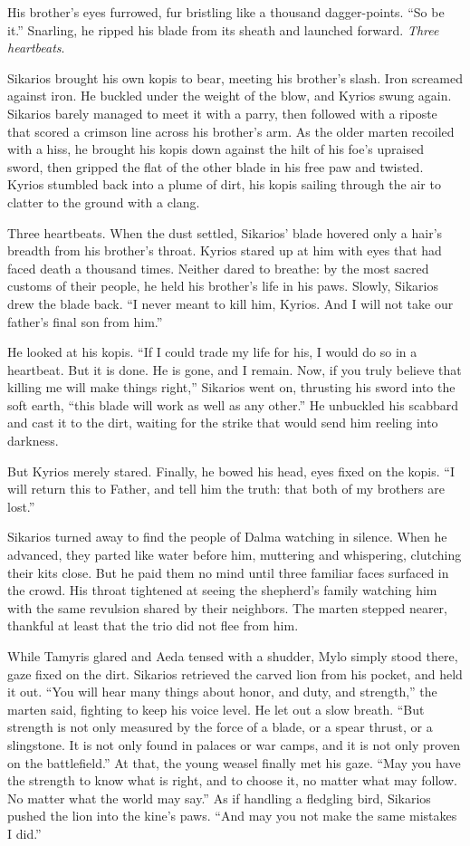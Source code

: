 His brother's eyes furrowed, fur bristling like a thousand dagger-points. ``So be it.'' Snarling, he ripped his blade from its sheath and launched forward. \emph{Three heartbeats}.

Sikarios brought his own kopis to bear, meeting his brother's slash. Iron screamed against iron. He buckled under the weight of the blow, and Kyrios swung again. Sikarios barely managed to meet it with a parry, then followed with a riposte that scored a crimson line across his brother's arm. As the older marten recoiled with a hiss, he brought his kopis down against the hilt of his foe's upraised sword, then gripped the flat of the other blade in his free paw and twisted. Kyrios stumbled back into a plume of dirt, his kopis sailing through the air to clatter to the ground with a clang.

Three heartbeats. When the dust settled, Sikarios' blade hovered only a hair's breadth from his brother's throat. Kyrios stared up at him with eyes that had faced death a thousand times. Neither dared to breathe: by the most sacred customs of their people, he held his brother's life in his paws. Slowly, Sikarios drew the blade back. ``I never meant to kill him, Kyrios. And I will not take our father's final son from him.''

He looked at his kopis. ``If I could trade my life for his, I would do so in a heartbeat. But it is done. He is gone, and I remain. Now, if you truly believe that killing me will make things right,'' Sikarios went on, thrusting his sword into the soft earth, ``this blade will work as well as any other.'' He unbuckled his scabbard and cast it to the dirt, waiting for the strike that would send him reeling into darkness.

But Kyrios merely stared. Finally, he bowed his head, eyes fixed on the kopis. ``I will return this to Father, and tell him the truth: that both of my brothers are lost.''

Sikarios turned away to find the people of Dalma watching in silence. When he advanced, they parted like water before him, muttering and whispering, clutching their kits close. But he paid them no mind until three familiar faces surfaced in the crowd. His throat tightened at seeing the shepherd's family watching him with the same revulsion shared by their neighbors. The marten stepped nearer, thankful at least that the trio did not flee from him.

While Tamyris glared and Aeda tensed with a shudder, Mylo simply stood there, gaze fixed on the dirt. Sikarios retrieved the carved lion from his pocket, and held it out. ``You will hear many things about honor, and duty, and strength,'' the marten said, fighting to keep his voice level. He let out a slow breath. ``But strength is not only measured by the force of a blade, or a spear thrust, or a slingstone. It is not only found in palaces or war camps, and it is not only proven on the battlefield.'' At that, the young weasel finally met his gaze. ``May you have the strength to know what is right, and to choose it, no matter what may follow. No matter what the world may say.'' As if handling a fledgling bird, Sikarios pushed the lion into the kine's paws. ``And may you not make the same mistakes I did.''

